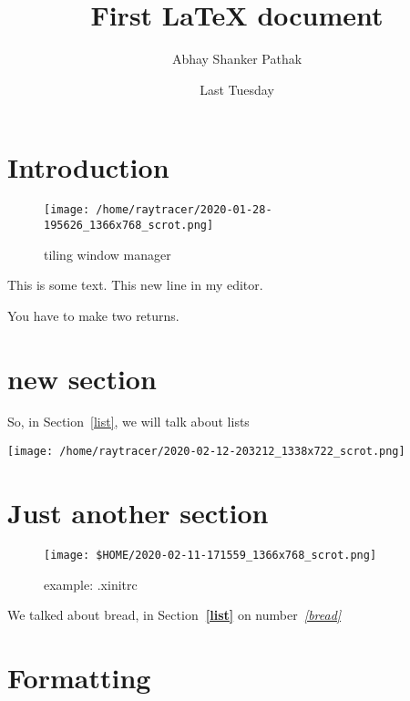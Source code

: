 \documentclass{article}	%
\author{Abhay Shanker Pathak}
\title{First {\LaTeX} document}
\date{Last Tuesday}
\begin{document}
\maketitle

\section{Introduction}

	\blindtext
	\blindtext
	\blindtext
	\begin{figure}[h]
	\centering
		\texttt{[image: /home/raytracer/2020-01-28-195626\_1366x768\_scrot.png]}
		\caption{tiling window manager}
	\end{figure}
	\blindtext
	\blindtext

	This is some text.
	This new line in my editor.

	You have to make two returns.

\section{new section}

So, in Section~\ref{list}, we will talk about lists

\begin{center}
\texttt{[image: /home/raytracer/2020-02-12-203212\_1338x722\_scrot.png]}
\end{center}

\section{Just another section}

\begin{figure}[h]	%
\begin{center}
\texttt{[image: \$HOME/2020-02-11-171559\_1366x768\_scrot.png]}
\end{center}
	\caption{example: .xinitrc}
\end{figure}

We talked about bread, in Section\textbf{~\ref{list}} on number\emph{~\ref{bread}}

\section{Formatting}
\end{document}
